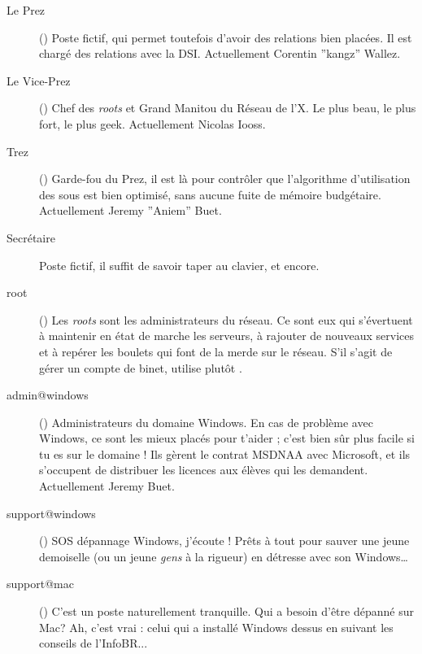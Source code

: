 \begin{description}

  \item[Le Prez]{() Poste fictif, qui permet toutefois d'avoir des relations bien plac\'ees. Il est chargé des relations avec la DSI. Actuellement Corentin ''kangz'' Wallez.}
  
  \item[Le Vice-Prez]{() Chef des \emph{roots} et Grand Manitou du Réseau de l'X. Le plus beau, le plus fort, le plus geek. Actuellement Nicolas Iooss.}

  \item[Trez]{() Garde-fou du Prez, il est là pour contrôler que l'algorithme d'utilisation des sous est bien optimisé, sans aucune fuite de mémoire budgétaire. Actuellement Jeremy ''Aniem'' Buet.}

  \item[Secrétaire]{Poste fictif, il suffit de savoir taper au clavier, et encore.}

  \item[root]{() Les \emph{roots} sont les administrateurs du r\'eseau. Ce sont eux qui s'\'evertuent \`a maintenir en \'etat de marche les serveurs, \`a rajouter de 
  nouveaux services et \`a rep\'erer les boulets qui font de la merde sur le r\'eseau. S'il s'agit de g\'erer un compte de binet, utilise plut\^ot .}

  \item[admin@windows] {() Administrateurs du domaine Windows. En cas de probl\`eme avec Windows, ce sont les mieux plac\'es pour t'aider ;
  c'est bien s\^ur  plus facile si tu es sur le domaine ! Ils gèrent le contrat
  MSDNAA avec Microsoft, et ils s'occupent de distribuer les licences aux élèves qui les demandent. Actuellement Jeremy Buet.}
  
  \item[support@windows] {() SOS d\'epannage Windows, j'\'ecoute ! Pr\^ets \`a tout pour sauver une jeune demoiselle (ou un jeune \emph{gens} \`a la rigueur) en d\'etresse avec son Windows\dots }

  \item[support@mac] {() C'est un poste naturellement tranquille. Qui a besoin d'\^etre d\'epann\'e sur Mac? Ah, c'est vrai : celui qui a install\'e Windows dessus en suivant les conseils de l'InfoBR... }



\end{description}
